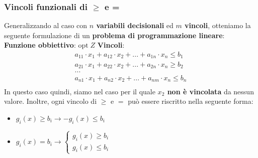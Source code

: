 \documentclass[12pt]{article}
\begin{document}
\subsubsection{Vincoli funzionali di $\geq$ e =}
Generalizzando al caso con \textbf{$n$ variabili decisionali} ed \textbf{$m$ vincoli}, otteniamo la seguente formulazione di un \textbf{problema di programmazione lineare}: \newline
\textbf{Funzione obbiettivo}: $\textrm{opt}\; Z$ \newline
\textbf{Vincoli}:
\begin{equation*}
    \begin{array}{ll}
        a_{11} \cdot x_1 + a_{12} \cdot x_2 + ... + a_{1n} \cdot x_n \leq b_1 \\
        a_{21} \cdot x_1 + a_{22} \cdot x_2 + ... + a_{2n} \cdot x_n \geq b_2 \\
        ... \\
        a_{n1} \cdot x_1 + a_{n2} \cdot x_2 + ... + a_{nm} \cdot x_n \leq b_n \\
    \end{array}
\end{equation*}
In questo caso quindi, siamo nel caso per il quale \textbf{$x_2$ non è vincolata} da nessun valore.
Inoltre, ogni vincolo di $\geq$ e $=$ può essere riscritto nella seguente forma:
\begin{itemize}
    \item $g_i(x) \geq b_i \rightarrow -g_i(x) \leq b_i$
    \item $g_i(x) = b_i \rightarrow \begin{cases}
        g_i(x) \geq b_i \\
        g_i(x) \leq b_i
    \end{cases}$
\end{itemize}
\end{document}
